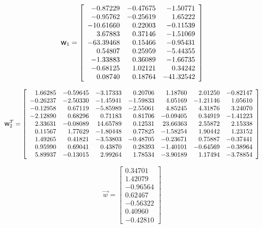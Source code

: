 \documentclass[preprint,12pt,times]{elsarticle}
\newcommand{\w}{\mbox{\large\ensuremath{\mathsf{w}}}}
\begin{document}
\begin{equation*}
\w_1=\left[
\begin{array}{rrr}
 -0.87229 & -0.47675 & -1.50771\\
 -0.95762 & -0.25619 &  1.65222\\
 -10.61660 &  0.22003 & -0.11539\\
  3.67883 &  0.37146 & -1.51069\\
 -63.39468 &  0.15466 & -0.95431\\
  0.54807 &  0.25959 & -5.44355\\
 -1.33883 &  0.36089 & -1.66735\\
 -0.68125 &  1.02121 &  0.34242\\
  0.08740 &  0.18764 & -41.32542
\end{array}\right]
\end{equation*}

\begin{equation*}
\w_2^T=\left[
\begin{array}{rrrrrrrrr}
  1.66285 & -0.59645 & -3.17333 &  0.20706 &  1.18760 &  2.01250 & -0.82147\\
 -0.26237 & -2.50330 & -1.45941 & -1.59833 &  4.05169 & -1.21146 &  1.05610\\
 -0.12958 &  0.67119 & -5.85989 & -2.55061 &  4.85245 &  4.31876 &  3.24070\\
 -2.12890 &  0.68296 &  0.71183 &  0.81706 & -0.09405 &  0.34919 & -1.41223\\
  2.33631 & -0.08089 &  14.65789 &  0.12531 &  23.66363 &  2.55872 &  2.15338\\
  0.11567 &  1.77629 & -1.80448 &  0.77825 & -1.58254 &  1.90442 &  1.23152\\
  1.49265 &  0.41821 & -3.53803 & -0.48705 & -0.23671 &  0.75887 & -0.37441\\
  0.95990 &  0.69041 &  0.43870 &  0.28393 & -1.40101 & -0.64569 & -0.38964\\
  5.89937 & -0.13015 &  2.99264 &  1.78534 & -3.90189 &  1.17494 & -3.78854
\end{array}\right]
\end{equation*}

\begin{equation*}
\overrightarrow{w}=\left[
\begin{array}{r}
  0.34701\\
  1.42079\\
 -0.96564\\
  0.62467\\
 -0.56322\\
  0.40960\\
 -0.42810
\end{array}\right]
\end{equation*}
\end{document}
